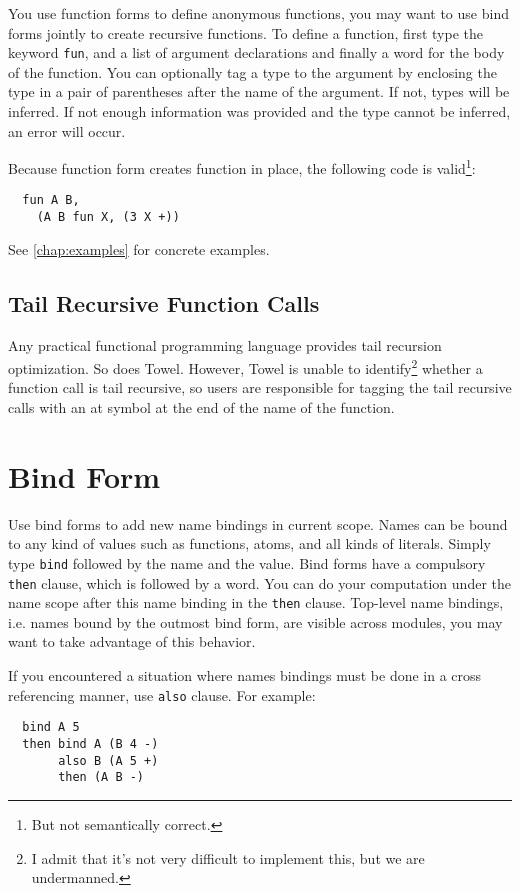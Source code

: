 \documentclass{book}
\begin{document}
You use function forms to define anonymous functions, you may want to use bind forms jointly to create recursive functions. To define a function, first type the keyword \texttt{fun}, and a list of argument declarations and finally a word for the body of the function. You can optionally tag a type to the argument by enclosing the type in a pair of parentheses after the name of the argument. If not, types will be inferred. If not enough information was provided and the type cannot be inferred, an error will occur.

Because function form creates function in place, the following code is valid\footnote{But not semantically correct.}:
\begin{verbatim}
  fun A B,
    (A B fun X, (3 X +))
\end{verbatim}

See \autoref{chap:examples} for concrete examples.

\subsection{Tail Recursive Function Calls}

Any practical functional programming language provides tail recursion optimization. So does Towel. However, Towel is unable to identify\footnote{I admit that it's not very difficult to implement this, but we are undermanned.} whether a function call is tail recursive, so users are responsible for tagging the tail recursive calls with an at symbol at the end of the name of the function.

\section{Bind Form}

Use bind forms to add new name bindings in current scope. Names can be bound to any kind of values such as functions, atoms, and all kinds of literals. Simply type \texttt{bind} followed by the name and the value. Bind forms have a compulsory \texttt{then} clause, which is followed by a word. You can do your computation under the name scope after this name binding in the \texttt{then} clause. Top-level name bindings, i.e. names bound by the outmost bind form, are visible across modules, you may want to take advantage of this behavior.

If you encountered a situation where names bindings must be done in a cross referencing manner, use \texttt{also} clause. For example:
\begin{verbatim}
  bind A 5
  then bind A (B 4 -)
       also B (A 5 +)
       then (A B -)
\end{verbatim}
\end{document}
